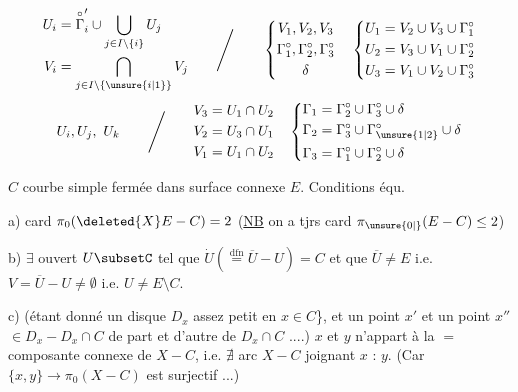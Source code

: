 \[
\begin{aligned}
 U_i&=\overset{\circ}{\Gamma}'_i\cup\bigcup_{j\in I\setminus\{i\}}U_j\\
 V_i&=\bigcap_{j\in I\setminus\{\unsure{i|1}\}}V_j
\end{aligned}
\qquad\Bigg/\qquad
\left\{\begin{gathered}
 V_1,V_2,V_3\\ \Gamma_1^\circ,\Gamma_2^\circ,\Gamma_3^\circ\\ \delta
\end{gathered}\right.
\quad
\left\{\begin{aligned}
 U_1&=V_2\cup V_3\cup\Gamma_1^\circ\\
 U_2&=V_3\cup V_1\cup\Gamma_2^\circ\\
 U_3&=V_1\cup V_2\cup\Gamma_3^\circ
\end{aligned}\right.
\]
\[
 U_i,U_j,\ U_k\qquad\Bigg/\qquad
\begin{aligned}
 V_3&=U_1\cap U_2\\
 V_2&=U_3\cap U_1\\
 V_1&=U_1\cap U_2
\end{aligned}
\quad
\left\{\begin{aligned}
 \Gamma_1&=\Gamma_2^\circ\cup\Gamma_3^\circ\cup\delta\\
 \Gamma_2&=\Gamma_3^\circ\cup\Gamma_{\unsure{1|2}}^\circ\cup\delta\\
 \Gamma_3&=\Gamma_1^\circ\cup\Gamma_2^\circ\cup\delta
\end{aligned}\right.
\]

$C$ courbe simple fermée dans surface connexe $E$. Conditions équ.

a) card $\pi_0(\deleted{X}E-C)=2$ \quad (\uline{NB} on a tjrs card $\pi_{\unsure{0|{}}}(E-C)\le 2$)

b) $\exists$ ouvert $U\subsetC$ tel que $\dot U(\overset{\text{dfn}}{=}\overline U-U)=C$ et que 
$\overline U\ne E$ i.e. $V=\overline U-U\ne\emptyset$ i.e. $U\ne E\setminus C$.

c) (étant donné un disque $D_x$ assez petit  en $x\in C$\}, et un point $x'$ et un point $x''$ $\in D_x-D_x\cap C$ de part et d'autre de $D_x\cap C$ ....)
$x$ et $y$ n'appart  à la $=$ composante connexe de $X-C$, i.e. $\nexists$ arc  $X-C$ joignant $x$ : $y$.
(Car $\{x,y\}\longrightarrow\pi_0(X-C)$ est surjectif ...)
